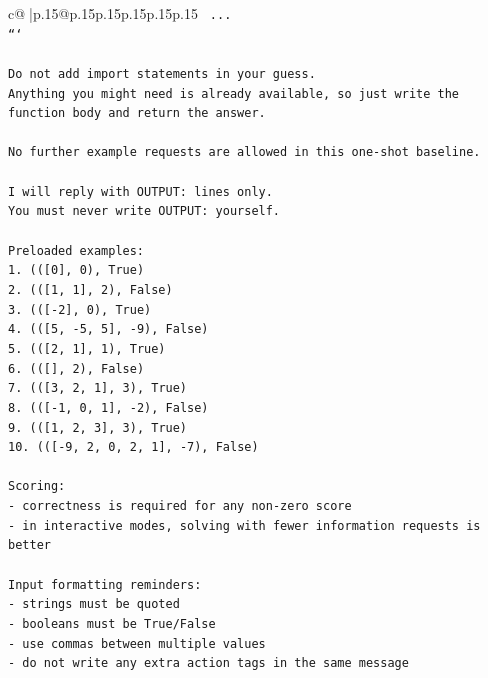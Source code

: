 \documentclass{article}
\begin{document}
{\begin{supertabular}{c@{$\;$}|p{.15\linewidth}@{}p{.15\linewidth}p{.15\linewidth}p{.15\linewidth}p{.15\linewidth}p{.15\linewidth}}
{{{\texttt{    ...} \\
\texttt{```} \\
\\ 
\texttt{Do not add import statements in your guess.} \\
\texttt{Anything you might need is already available, so just write the function body and return the answer.} \\
\\ 
\texttt{No further example requests are allowed in this one{-}shot baseline.} \\
\\ 
\texttt{I will reply with OUTPUT: lines only.} \\
\texttt{You must never write OUTPUT: yourself.} \\
\\ 
\texttt{Preloaded examples:} \\
\texttt{1. (({[}0{]}, 0), True)} \\
\texttt{2. (({[}1, 1{]}, 2), False)} \\
\texttt{3. (({[}{-}2{]}, 0), True)} \\
\texttt{4. (({[}5, {-}5, 5{]}, {-}9), False)} \\
\texttt{5. (({[}2, 1{]}, 1), True)} \\
\texttt{6. (({[}{]}, 2), False)} \\
\texttt{7. (({[}3, 2, 1{]}, 3), True)} \\
\texttt{8. (({[}{-}1, 0, 1{]}, {-}2), False)} \\
\texttt{9. (({[}1, 2, 3{]}, 3), True)} \\
\texttt{10. (({[}{-}9, 2, 0, 2, 1{]}, {-}7), False)} \\
\\ 
\texttt{Scoring:} \\
\texttt{{-} correctness is required for any non{-}zero score} \\
\texttt{{-} in interactive modes, solving with fewer information requests is better} \\
\\ 
\texttt{Input formatting reminders:} \\
\texttt{{-} strings must be quoted} \\
\texttt{{-} booleans must be True/False} \\
\texttt{{-} use commas between multiple values} \\
\texttt{{-} do not write any extra action tags in the same message} \\
\\ 
}}}
\end{supertabular}}
\end{document}
